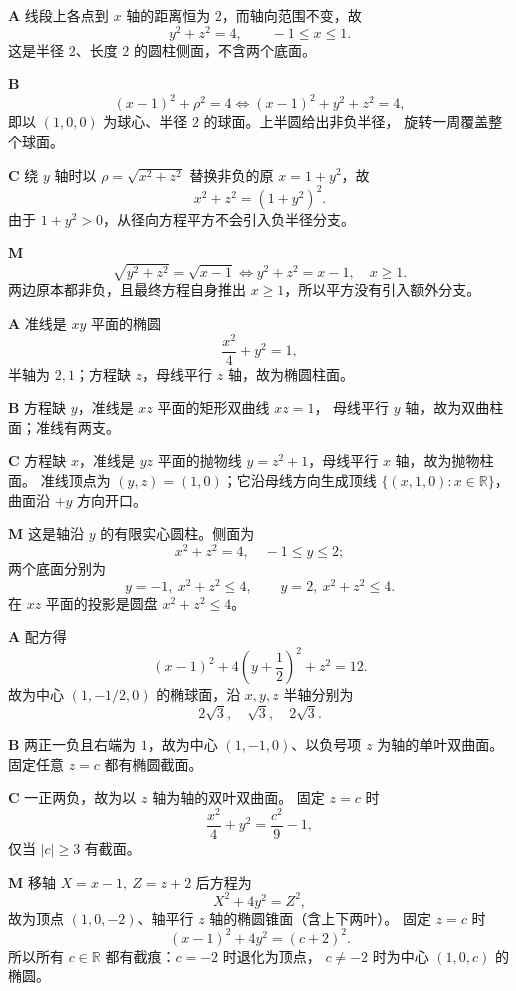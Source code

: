 \begin{solutionBox}
\textbf{A}\quad
线段上各点到 \(x\) 轴的距离恒为 \(2\)，而轴向范围不变，故
\[
y^2+z^2=4,\qquad -1\le x\le1.
\]
这是半径 \(2\)、长度 \(2\) 的圆柱侧面，不含两个底面。

\textbf{B}\quad
\[
(x-1)^2+\rho^2=4
\Longleftrightarrow
(x-1)^2+y^2+z^2=4,
\]
即以 \((1,0,0)\) 为球心、半径 \(2\) 的球面。上半圆给出非负半径，
旋转一周覆盖整个球面。

\textbf{C}\quad
绕 \(y\) 轴时以
\(\rho=\sqrt{x^2+z^2}\) 替换非负的原 \(x=1+y^2\)，故
\[
x^2+z^2=(1+y^2)^2.
\]
由于 \(1+y^2>0\)，从径向方程平方不会引入负半径分支。

\textbf{M}\quad
\[
\sqrt{y^2+z^2}=\sqrt{x-1}
\Longleftrightarrow
y^2+z^2=x-1,\quad x\ge1.
\]
两边原本都非负，且最终方程自身推出 \(x\ge1\)，所以平方没有引入额外分支。
\end{solutionBox}

\begin{solutionBox}
\textbf{A}\quad
准线是 \(xy\) 平面的椭圆
\[
\frac{x^2}{4}+y^2=1,
\]
半轴为 \(2,1\)；方程缺 \(z\)，母线平行 \(z\) 轴，故为椭圆柱面。

\textbf{B}\quad
方程缺 \(y\)，准线是 \(xz\) 平面的矩形双曲线 \(xz=1\)，
母线平行 \(y\) 轴，故为双曲柱面；准线有两支。

\textbf{C}\quad
方程缺 \(x\)，准线是 \(yz\) 平面的抛物线
\(y=z^2+1\)，母线平行 \(x\) 轴，故为抛物柱面。
准线顶点为 \((y,z)=(1,0)\)；它沿母线方向生成顶线
\(\{(x,1,0):x\in\mathbb R\}\)，曲面沿 \(+y\) 方向开口。

\textbf{M}\quad
这是轴沿 \(y\) 的有限实心圆柱。侧面为
\[
x^2+z^2=4,\quad -1\le y\le2;
\]
两个底面分别为
\[
y=-1,\ x^2+z^2\le4,\qquad
y=2,\ x^2+z^2\le4.
\]
在 \(xz\) 平面的投影是圆盘 \(x^2+z^2\le4\)。
\end{solutionBox}

\begin{solutionBox}
\textbf{A}\quad
配方得
\[
(x-1)^2+4\left(y+\frac12\right)^2+z^2=12.
\]
故为中心 \((1,-1/2,0)\) 的椭球面，沿 \(x,y,z\) 半轴分别为
\[
2\sqrt3,\quad \sqrt3,\quad 2\sqrt3.
\]

\textbf{B}\quad
两正一负且右端为 \(1\)，故为中心 \((1,-1,0)\)、以负号项
\(z\) 为轴的单叶双曲面。固定任意 \(z=c\) 都有椭圆截面。

\textbf{C}\quad
一正两负，故为以 \(z\) 轴为轴的双叶双曲面。
固定 \(z=c\) 时
\[
\frac{x^2}{4}+y^2=\frac{c^2}{9}-1,
\]
仅当 \(|c|\ge3\) 有截面。

\textbf{M}\quad
移轴 \(X=x-1,\ Z=z+2\) 后方程为
\[
X^2+4y^2=Z^2,
\]
故为顶点 \((1,0,-2)\)、轴平行 \(z\) 轴的椭圆锥面（含上下两叶）。
固定 \(z=c\) 时
\[
(x-1)^2+4y^2=(c+2)^2.
\]
所以所有 \(c\in\mathbb R\) 都有截痕：\(c=-2\) 时退化为顶点，
\(c\ne-2\) 时为中心 \((1,0,c)\) 的椭圆。
\end{solutionBox}

